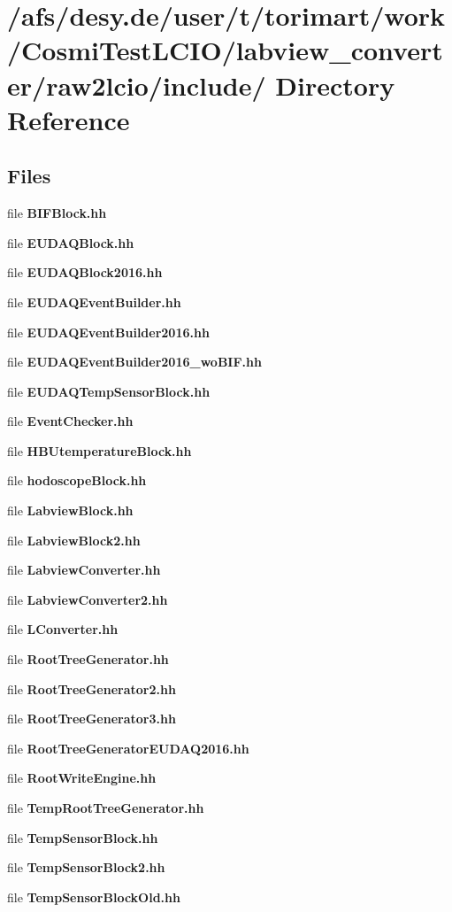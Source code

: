 \section{/afs/desy.de/user/t/torimart/work/CosmiTestLCIO/labview\_\-converter/raw2lcio/include/ Directory Reference}
\label{dir_55fca3d99a726b7ca1a5be083ce2821c}
\subsection*{Files}
\begin{DoxyCompactItemize}
\item 
file {\bfseries BIFBlock.hh}
\item 
file {\bfseries EUDAQBlock.hh}
\item 
file {\bfseries EUDAQBlock2016.hh}
\item 
file {\bfseries EUDAQEventBuilder.hh}
\item 
file {\bfseries EUDAQEventBuilder2016.hh}
\item 
file {\bfseries EUDAQEventBuilder2016\_\-woBIF.hh}
\item 
file {\bfseries EUDAQTempSensorBlock.hh}
\item 
file {\bfseries EventChecker.hh}
\item 
file {\bfseries HBUtemperatureBlock.hh}
\item 
file {\bfseries hodoscopeBlock.hh}
\item 
file {\bfseries LabviewBlock.hh}
\item 
file {\bfseries LabviewBlock2.hh}
\item 
file {\bfseries LabviewConverter.hh}
\item 
file {\bfseries LabviewConverter2.hh}
\item 
file {\bfseries LConverter.hh}
\item 
file {\bfseries RootTreeGenerator.hh}
\item 
file {\bfseries RootTreeGenerator2.hh}
\item 
file {\bfseries RootTreeGenerator3.hh}
\item 
file {\bfseries RootTreeGeneratorEUDAQ2016.hh}
\item 
file {\bfseries RootWriteEngine.hh}
\item 
file {\bfseries TempRootTreeGenerator.hh}
\item 
file {\bfseries TempSensorBlock.hh}
\item 
file {\bfseries TempSensorBlock2.hh}
\item 
file {\bfseries TempSensorBlockOld.hh}
\end{DoxyCompactItemize}
